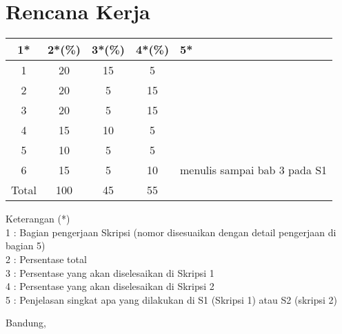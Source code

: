 \documentclass[a4paper,twoside]{article}
\begin{document}
\section{Rencana Kerja}
\begin{center}
  \begin{tabular}{ | c | c | c | c | l |}
    \hline
    1*  & 2*(\%) & 3*(\%) & 4*(\%) &5*\\ \hline \hline
    1   & 20 & 15 & 5  & {\footnotesize } \\ \hline
    2   & 20 & 5  & 15 & {\footnotesize } \\ \hline
    3   & 20 & 5  & 15 & {\footnotesize } \\ \hline
    4   & 15 & 10 & 5  & {\footnotesize } \\ \hline
    5   & 10 & 5  & 5  & {\footnotesize } \\ \hline
    6   & 15 & 5  & 10 & {\footnotesize menulis sampai bab 3 pada S1} \\ \hline
    Total  & 100  & 45 & 55 &  \\ \hline
                          \end{tabular}
\end{center}

Keterangan (*)\\
1 : Bagian pengerjaan Skripsi (nomor disesuaikan dengan detail pengerjaan di bagian 5)\\
2 : Persentase total \\
3 : Persentase yang akan diselesaikan di Skripsi 1 \\
4 : Persentase yang akan diselesaikan di Skripsi 2 \\
5 : Penjelasan singkat apa yang dilakukan di S1 (Skripsi 1) atau S2 (skripsi 2)

\vspace{1cm}
\centering Bandung, \tanggal\\
\vspace{2cm} \nama \\ 
\vspace{1cm}
\end{document}
